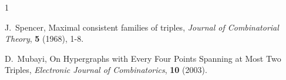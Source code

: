 \documentclass[10pt,a4paper]{article}
\theoremstyle{definition}
\begin{document}
\begin{thebibliography}{1}

     J.~Spencer, Maximal consistent families of triples, {\em Journal of Combinatorial Theory}, {\bf 5} (1968), 1-8.


     D.~Mubayi, On Hypergraphs with Every Four Points Spanning at Most Two Triples, {\em Electronic Journal of Combinatorics}, {\bf 10} (2003).




\end{thebibliography}
\end{document}
